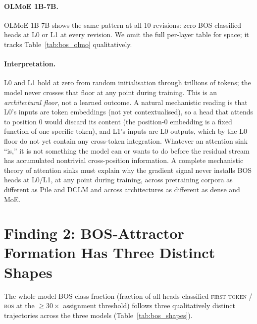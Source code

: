 \documentclass[11pt]{article}
\begin{document}
\paragraph{OLMoE 1B-7B.} OLMoE 1B-7B shows the same pattern at all 10
revisions: zero BOS-classified heads at L0 or L1 at every revision. We
omit the full per-layer table for space; it tracks
Table~\ref{tab:bos_olmo} qualitatively.

\paragraph{Interpretation.} L0 and L1 hold at zero from random
initialisation through trillions of tokens; the model never crosses that
floor at any point during training. This is an \emph{architectural floor},
not a learned outcome. A natural mechanistic reading is that L0's inputs
are token embeddings (not yet contextualised), so a head that attends to
position 0 would discard its content (the position-0 embedding is a fixed
function of one specific token), and L1's inputs are L0 outputs, which by
the L0 floor do not yet contain any cross-token integration. Whatever an
attention sink ``is,'' it is not something the model can or wants to do
before the residual stream has accumulated nontrivial cross-position
information. A complete mechanistic theory of attention sinks must
explain why the gradient signal never installs BOS heads at L0/L1, at any
point during training, across pretraining corpora as different as Pile
and DCLM and across architectures as different as dense and MoE.

\section{Finding 2: BOS-Attractor Formation Has Three Distinct Shapes}
\label{sec:f2}

The whole-model BOS-class fraction (fraction of all heads classified
\textsc{first-token / bos} at the $\ge 30\times$ assignment threshold)
follows three qualitatively distinct trajectories across the three models
(Table~\ref{tab:bos_shapes}).
\end{document}

